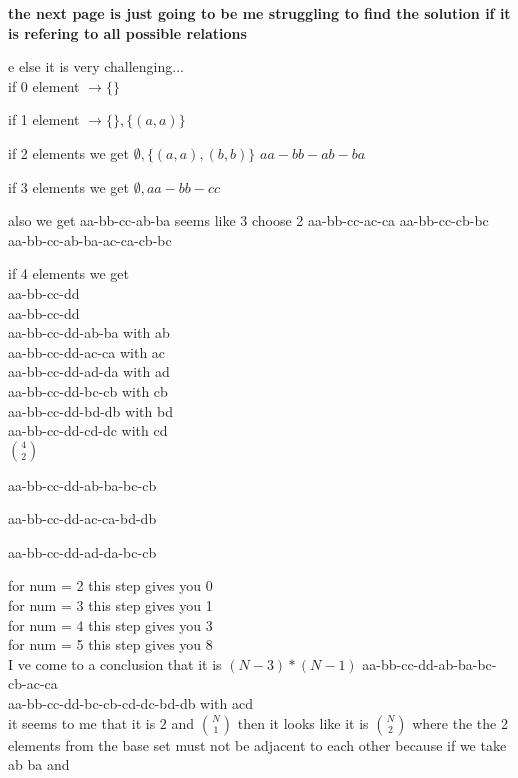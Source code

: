 \documentclass[12pts,A4]{article}
\begin{document}
\begin{flushleft}
    \textbf{the next page is just going to be me struggling to find the solution if it is refering to all possible relations}
    
    \pagebreak 
    
e   else it is very challenging... \\
    
    if 0 element $\rightarrow \{\}$

    if 1 element $\rightarrow \{\} , \{(a,a)\}$ 

    if 2 elements we get $ \emptyset , \{ (a,a),(b,b) \}$
                         $ aa-bb-ab-ba$

    if 3 elements we get $\emptyset, aa-bb-cc$

    also we get aa-bb-cc-ab-ba seems like 3 choose 2
                aa-bb-cc-ac-ca
                aa-bb-cc-cb-bc
                aa-bb-cc-ab-ba-ac-ca-cb-bc

    if 4 elements we get\\
                
                aa-bb-cc-dd\\

                aa-bb-cc-dd\\
                aa-bb-cc-dd-ab-ba with ab\\
                aa-bb-cc-dd-ac-ca with ac\\
                aa-bb-cc-dd-ad-da with ad\\
                aa-bb-cc-dd-bc-cb with cb\\
                aa-bb-cc-dd-bd-db with bd\\
                aa-bb-cc-dd-cd-dc with cd\\

                $\binom {4}{2}$

                aa-bb-cc-dd-ab-ba-bc-cb

                aa-bb-cc-dd-ac-ca-bd-db

                aa-bb-cc-dd-ad-da-bc-cb

                for num = 2 this step gives you 0\\
                for num = 3 this step gives you 1\\
                for num = 4 this step gives you 3\\
                for num = 5 this step gives you 8\\

                I ve come to a conclusion that it is $(N-3)*(N-1)$
                aa-bb-cc-dd-ab-ba-bc-cb-ac-ca \\
                aa-bb-cc-dd-bc-cb-cd-dc-bd-db with acd\\
   
   \bigskip
   it seems to me that it is $ 2 $ and $\binom {N} {1}$
   then it looks like it is $\binom {N}{2} $ where the the 2 elements from the base set must not be adjacent to each other 
    because if we take ab ba and 
    
\end{flushleft}
\end{document}
